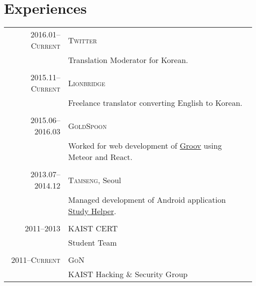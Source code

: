 \documentclass[a4paper,10pt]{article}
\begin{document}
\section{Experiences}
\begin{tabular}{r|p{11cm}}
  \textsc{2016.01--Current} & \textsc{Twitter} \\
                            & Translation Moderator for Korean. \\
  \multicolumn{2}{c}{} \\

  \textsc{2015.11--Current} & \textsc{Lionbridge} \\
                            & Freelance translator converting English to Korean. \\
  \multicolumn{2}{c}{} \\

  \textsc{2015.06--2016.03} & \textsc{GoldSpoon} \\
                            & Worked for web development of \href{http://groov.fm}{Groov} using Meteor and React. \\
  \multicolumn{2}{c}{} \\

  \textsc{2013.07--2014.12} & \textsc{Tamseng}, Seoul \\
                            & Managed development of Android application \href{https://play.google.com/store/apps/details?id=kr.co.tamseng.StudyHelper}{Study Helper}. \\
  \multicolumn{2}{c}{} \\

  \textsc{2011--2013} & \textsc{KAIST CERT} \\
                      & Student Team \\
  \multicolumn{2}{c}{} \\

  \textsc{2011--Current} & \textsc{GoN} \\
                         & KAIST Hacking \& Security Group \\
\end{tabular}
\end{document}
